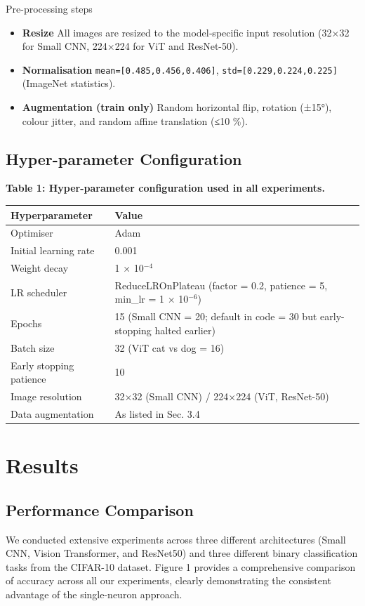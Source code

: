 \documentclass[11pt]{article}
\begin{document}
Pre-processing steps
\begin{itemize}
\item \textbf{Resize} All images are resized to the model‐specific input resolution (32×32 for Small CNN, 224×224 for ViT and ResNet-50).
\item \textbf{Normalisation} \texttt{mean=[0.485,0.456,0.406]}, \texttt{std=[0.229,0.224,0.225]} (ImageNet statistics).
\item \textbf{Augmentation (train only)} Random horizontal flip, rotation (±15°), colour jitter, and random affine translation (≤10 \%).
\end{itemize}

\subsection{Hyper-parameter Configuration}
\textbf{Table 1: Hyper-parameter configuration used in all experiments.}

\begin{tabular}{ll}
\hline
Hyperparameter & Value \\
\hline
Optimiser & Adam \\
Initial learning rate & 0.001 \\
Weight decay & 1 × 10$^{-4}$ \\
LR scheduler & ReduceLROnPlateau (factor = 0.2, patience = 5, min\_lr = 1 × 10$^{-6}$) \\
Epochs & 15 (Small CNN = 20; default in code = 30 but early-stopping halted earlier) \\
Batch size & 32 (ViT cat vs dog = 16) \\
Early stopping patience & 10 \\
Image resolution & 32×32 (Small CNN) / 224×224 (ViT, ResNet-50) \\
Data augmentation & As listed in Sec. 3.4 \\
\hline
\end{tabular}

\section{Results}
\subsection{Performance Comparison}
We conducted extensive experiments across three different architectures (Small CNN, Vision Transformer, and ResNet50) and three different binary classification tasks from the CIFAR-10 dataset. Figure 1 provides a comprehensive comparison of accuracy across all our experiments, clearly demonstrating the consistent advantage of the single-neuron approach.
\end{document}
